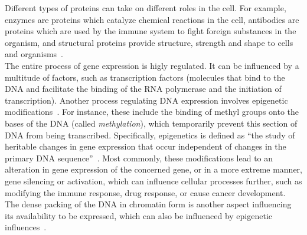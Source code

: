Different types of proteins can take on different roles in the cell. For example, enzymes are proteins which catalyze chemical reactions in the cell, antibodies are proteins which are used by the immune system to fight foreign substances in the organism, and structural proteins provide structure, strength and shape to cells and organisms~\cite{molecular_cell_biology}.\\
The entire process of gene expression is higly regulated. It can be influenced by a multitude of factors, such as transcription factors (molecules that bind to the DNA and facilitate the binding of the RNA polymerase and the initiation of transcription). Another process regulating DNA expression involves epigenetic modifications~\cite{epigenetics_alternative_splicing,histone_exchange_transcription_regulation}. For instance, these include the binding of methyl groups onto the bases of the DNA (called \emph{methylation}), which temporarily prevent this section of DNA from being transcribed. Specifically, epigenetics is defined as ``the study of heritable changes in gene expression that occur independent of changes in the primary DNA sequence''~\cite{epigenetics_in_cancer}. Most commonly, these modifications lead to an alteration in gene expression of the concerned gene, or in a more extreme manner, gene silencing or activation, which can influence cellular processes further, such as modifying the immune response, drug response, or cause cancer development. The dense packing of the DNA in chromatin form is another aspect influencing its availability to be expressed, which can also be influenced by epigenetic influences~\cite{molecular_cell_biology}.\\
